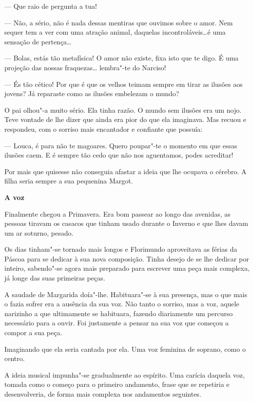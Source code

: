 --- Que raio de pergunta a tua!

--- Não, a sério, não é nada dessas mentiras que ouvimos sobre o amor. Nem
sequer tem a ver com uma atração animal, daquelas incontroláveis\ldots{}é
uma sensação de pertença\ldots{}

--- Bolas, estás tão metafísica! O amor não existe, fixa isto que te digo.
É uma projeção das nossas fraquezas\ldots{} lembra"-te do Narciso!

--- És tão cético! Por que é que os velhos teimam sempre em tirar as
ilusões aos jovens? Já reparaste como as ilusões embelezam o mundo?

O pai olhou"-a muito sério. Ela tinha razão. O mundo sem ilusões era
um nojo. Teve vontade de lhe dizer que ainda era pior do que ela
imaginava. Mas recuou e respondeu, com o sorriso mais encantador e
confiante que possuía:

--- Louca, é para não te magoares. Quero poupar"-te o momento em que essas
ilusões caem. E é sempre tão cedo que não nos aguentamos, podes
acreditar!

Por mais que quisesse não conseguia afastar a ideia que lhe ocupava o
cérebro. A filha seria sempre a sua pequenina Margot.


\vspace*{1.8cm}
\noindent{}\textbf{A voz}

\bigskip

Finalmente chegou a Primavera. Era bom passear ao longo das avenidas, as
pessoas tiravam os casacos que tinham usado durante o Inverno e que lhes
davam um ar soturno, pesado.

Os dias tinham"-se tornado mais longos e Florimundo aproveitava as férias
da Páscoa para se dedicar à sua nova composição. Tinha desejo de se lhe
dedicar por inteiro, sabendo"-se agora mais preparado para escrever uma
peça mais complexa, já longe das suas primeiras peças.

A saudade de Margarida doía"-lhe. Habituara"-se à sua presença, mas o que
mais o fazia sofrer era a ausência da sua voz. Não tanto o sorriso, mas
a voz, aquele narizinho a que ultimamente se habituara, fazendo
diariamente um percurso necessário para a ouvir. Foi justamente a pensar
na sua voz que começou a compor a sua peça.

Imaginando que ela seria cantada por ela. Uma voz feminina de soprano,
como o centro.

A ideia musical impunha"-se gradualmente ao espírito. Uma carícia daquela
voz, tomada como o começo para o primeiro andamento, frase que se
repetiria e desenvolveria, de forma mais complexa nos andamentos
seguintes.

